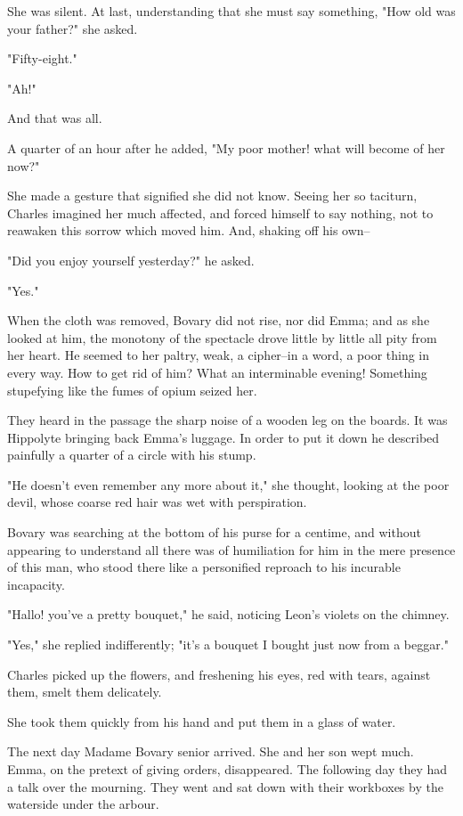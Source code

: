 \documentclass{tufte-book}
\begin{document}
She was silent. At last, understanding that she must say something, "How
old was your father?" she asked.

"Fifty-eight."

"Ah!"

And that was all.

A quarter of an hour after he added, "My poor mother! what will become
of her now?"

She made a gesture that signified she did not know. Seeing her so
taciturn, Charles imagined her much affected, and forced himself to say
nothing, not to reawaken this sorrow which moved him. And, shaking off
his own--

"Did you enjoy yourself yesterday?" he asked.

"Yes."

When the cloth was removed, Bovary did not rise, nor did Emma; and as
she looked at him, the monotony of the spectacle drove little by little
all pity from her heart. He seemed to her paltry, weak, a cipher--in
a word, a poor thing in every way. How to get rid of him? What an
interminable evening! Something stupefying like the fumes of opium
seized her.

They heard in the passage the sharp noise of a wooden leg on the boards.
It was Hippolyte bringing back Emma's luggage. In order to put it down
he described painfully a quarter of a circle with his stump.

"He doesn't even remember any more about it," she thought, looking at
the poor devil, whose coarse red hair was wet with perspiration.

Bovary was searching at the bottom of his purse for a centime, and
without appearing to understand all there was of humiliation for him
in the mere presence of this man, who stood there like a personified
reproach to his incurable incapacity.

"Hallo! you've a pretty bouquet," he said, noticing Leon's violets on
the chimney.

"Yes," she replied indifferently; "it's a bouquet I bought just now from
a beggar."

Charles picked up the flowers, and freshening his eyes, red with tears,
against them, smelt them delicately.

She took them quickly from his hand and put them in a glass of water.

The next day Madame Bovary senior arrived. She and her son wept much.
Emma, on the pretext of giving orders, disappeared. The following day
they had a talk over the mourning. They went and sat down with their
workboxes by the waterside under the arbour.
\end{document}
